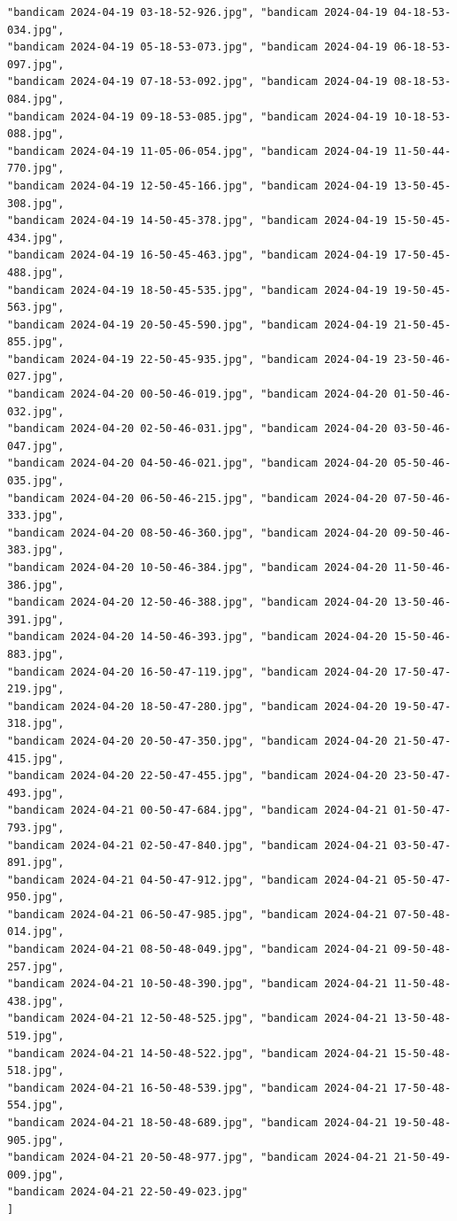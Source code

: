\documentclass[11pt]{article}
\begin{document}
\begin{verbatim}
"bandicam 2024-04-19 03-18-52-926.jpg", "bandicam 2024-04-19 04-18-53-034.jpg",
"bandicam 2024-04-19 05-18-53-073.jpg", "bandicam 2024-04-19 06-18-53-097.jpg",
"bandicam 2024-04-19 07-18-53-092.jpg", "bandicam 2024-04-19 08-18-53-084.jpg",
"bandicam 2024-04-19 09-18-53-085.jpg", "bandicam 2024-04-19 10-18-53-088.jpg",
"bandicam 2024-04-19 11-05-06-054.jpg", "bandicam 2024-04-19 11-50-44-770.jpg",
"bandicam 2024-04-19 12-50-45-166.jpg", "bandicam 2024-04-19 13-50-45-308.jpg",
"bandicam 2024-04-19 14-50-45-378.jpg", "bandicam 2024-04-19 15-50-45-434.jpg",
"bandicam 2024-04-19 16-50-45-463.jpg", "bandicam 2024-04-19 17-50-45-488.jpg",
"bandicam 2024-04-19 18-50-45-535.jpg", "bandicam 2024-04-19 19-50-45-563.jpg",
"bandicam 2024-04-19 20-50-45-590.jpg", "bandicam 2024-04-19 21-50-45-855.jpg",
"bandicam 2024-04-19 22-50-45-935.jpg", "bandicam 2024-04-19 23-50-46-027.jpg",
"bandicam 2024-04-20 00-50-46-019.jpg", "bandicam 2024-04-20 01-50-46-032.jpg",
"bandicam 2024-04-20 02-50-46-031.jpg", "bandicam 2024-04-20 03-50-46-047.jpg",
"bandicam 2024-04-20 04-50-46-021.jpg", "bandicam 2024-04-20 05-50-46-035.jpg",
"bandicam 2024-04-20 06-50-46-215.jpg", "bandicam 2024-04-20 07-50-46-333.jpg",
"bandicam 2024-04-20 08-50-46-360.jpg", "bandicam 2024-04-20 09-50-46-383.jpg",
"bandicam 2024-04-20 10-50-46-384.jpg", "bandicam 2024-04-20 11-50-46-386.jpg",
"bandicam 2024-04-20 12-50-46-388.jpg", "bandicam 2024-04-20 13-50-46-391.jpg",
"bandicam 2024-04-20 14-50-46-393.jpg", "bandicam 2024-04-20 15-50-46-883.jpg",
"bandicam 2024-04-20 16-50-47-119.jpg", "bandicam 2024-04-20 17-50-47-219.jpg",
"bandicam 2024-04-20 18-50-47-280.jpg", "bandicam 2024-04-20 19-50-47-318.jpg",
"bandicam 2024-04-20 20-50-47-350.jpg", "bandicam 2024-04-20 21-50-47-415.jpg",
"bandicam 2024-04-20 22-50-47-455.jpg", "bandicam 2024-04-20 23-50-47-493.jpg",
"bandicam 2024-04-21 00-50-47-684.jpg", "bandicam 2024-04-21 01-50-47-793.jpg",
"bandicam 2024-04-21 02-50-47-840.jpg", "bandicam 2024-04-21 03-50-47-891.jpg",
"bandicam 2024-04-21 04-50-47-912.jpg", "bandicam 2024-04-21 05-50-47-950.jpg",
"bandicam 2024-04-21 06-50-47-985.jpg", "bandicam 2024-04-21 07-50-48-014.jpg",
"bandicam 2024-04-21 08-50-48-049.jpg", "bandicam 2024-04-21 09-50-48-257.jpg",
"bandicam 2024-04-21 10-50-48-390.jpg", "bandicam 2024-04-21 11-50-48-438.jpg",
"bandicam 2024-04-21 12-50-48-525.jpg", "bandicam 2024-04-21 13-50-48-519.jpg",
"bandicam 2024-04-21 14-50-48-522.jpg", "bandicam 2024-04-21 15-50-48-518.jpg",
"bandicam 2024-04-21 16-50-48-539.jpg", "bandicam 2024-04-21 17-50-48-554.jpg",
"bandicam 2024-04-21 18-50-48-689.jpg", "bandicam 2024-04-21 19-50-48-905.jpg",
"bandicam 2024-04-21 20-50-48-977.jpg", "bandicam 2024-04-21 21-50-49-009.jpg",
"bandicam 2024-04-21 22-50-49-023.jpg"
]
\end{verbatim}
\end{document}
